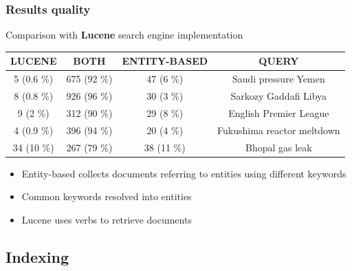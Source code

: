 \documentclass{beamer}
\begin{document}
\begin{frame}
\frametitle{Results quality}
Comparison with {\bfseries Lucene} search engine implementation\\
\bigskip
\scriptsize
\begin{center}
\begin{tabular}{c|c|c|c}
\bfseries LUCENE & \bfseries BOTH & \bfseries ENTITY-BASED & \bfseries
QUERY\\
\hline
5 (0.6 \%) & 675 (92 \%) & 47 (6 \%) & Saudi pressure Yemen\\
8 (0.8 \%) & 926 (96 \%) & 30 (3 \%) & Sarkozy Gaddafi Libya\\
9 (2 \%) & 312 (90 \%) & 29 (8 \%) & English Premier League\\
4 (0.9 \%) & 396 (94 \%) & 20 (4 \%) & Fukushima reactor meltdown\\
34 (10 \%) & 267 (79 \%) & 38 (11 \%) & Bhopal gas leak
\end{tabular}
\end{center}
\begin{itemize}
\item Entity-based collects documents referring to entities using
  different keywords
\item Common keywords resolved into entities
\item Lucene uses verbs to retrieve documents
\end{itemize}
\end{frame}

\subsection{Indexing}
\end{document}
